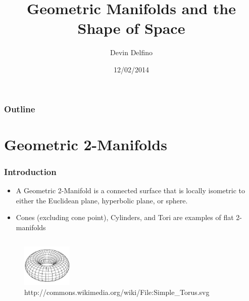 \documentclass[13pt]{beamer}
\title{Geometric Manifolds and the Shape of Space}
\author{Devin Delfino}
\institute{MATH 331: Geometry}
\date{12/02/2014}
\begin{document}
\frame{\titlepage}

\begin{frame}
\frametitle{Outline}
\tableofcontents
\end{frame}

\section{Geometric 2-Manifolds} %
\begin{frame}
\frametitle{Introduction}
	\begin{itemize}
		\item A \alert{Geometric 2-Manifold} is a connected surface that is locally isometric to either the Euclidean plane, hyperbolic plane, or sphere.
		\item Cones (excluding cone point), Cylinders, and Tori are examples of flat 2-manifolds
	\end{itemize}
	\begin{columns}[r] %
     \centering
      \begin{figure}
        \includegraphics[height=2cm]{./img/torus}
        \caption{http://commons.wikimedia.org/wiki/File:Simple\_Torus.svg}
      \end{figure}
  \end{columns}
\end{frame}
\end{document}

